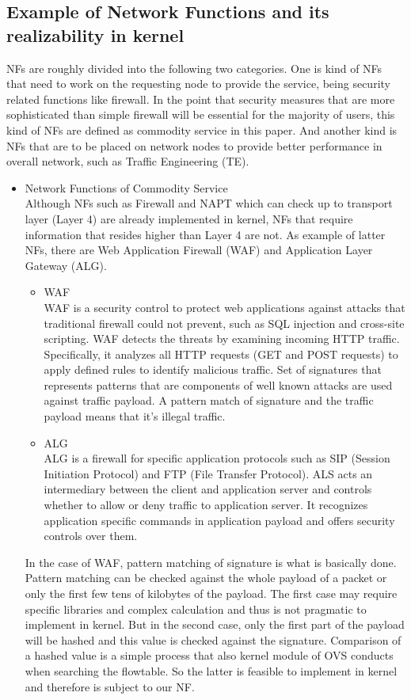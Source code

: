 \subsection{Example of Network Functions and its realizability in kernel}
NFs are roughly divided into the following two categories. One is kind of NFs that need to work on the requesting node to provide the service, being security related functions like firewall. In the point that security measures that are more sophisticated than simple firewall will be essential for the majority of users, this kind of NFs are defined as commodity service in this paper. And another kind is NFs that are to be placed on network nodes to provide better performance in overall network, such as Traffic Engineering (TE). 
\begin{itemize}
	\item Network Functions of Commodity Service\\
		Although NFs such as Firewall and NAPT which can check up to transport layer (Layer 4) are already implemented in kernel, NFs that require information that resides higher than Layer 4 are not. As example of latter NFs, there are Web Application Firewall (WAF) and Application Layer Gateway (ALG). 
		\begin{itemize}
			\item WAF\\
				WAF is a security control to protect web applications against attacks that traditional firewall could not prevent, such as SQL injection and cross-site scripting. WAF detects the threats by examining incoming HTTP traffic. Specifically, it analyzes all HTTP requests (GET and POST requests) to apply defined rules to identify malicious traffic. Set of signatures that represents patterns that are components of well known attacks are used against traffic payload. A pattern match of signature and the traffic payload means that it's illegal traffic.
			\item ALG\\
				ALG is a firewall for specific application protocols such as SIP (Session Initiation Protocol) and FTP (File Transfer Protocol). ALS acts an intermediary between the client and application server and controls whether to allow or deny traffic to application server. It recognizes application specific commands in application payload and offers security controls over them. 
		\end{itemize}
	
		In the case of WAF, pattern matching of signature is what is basically done. Pattern matching can be checked against the whole payload of a packet or only the first few tens of kilobytes of the payload. The first case may require specific libraries and complex calculation and thus is not pragmatic to implement in kernel. But in the second case, only the first part of the payload will be hashed and this value is checked against the signature. Comparison of a hashed value is a simple process that also kernel module of OVS conducts when searching the flowtable. So the latter is feasible to implement in kernel and therefore is subject to our NF. 
		

\end{itemize}
